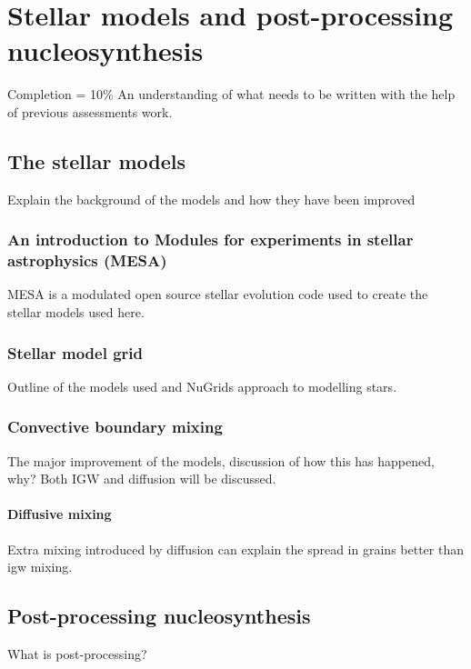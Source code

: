 \chapter{Stellar models and post-processing nucleosynthesis}

Completion = 10\%
An understanding of what needs to be written with the help of previous assessments work.

\section{The stellar models}

Explain the background of the models and how they have been improved

\subsection{An introduction to Modules for experiments in stellar astrophysics (MESA)}

MESA is a modulated open source stellar evolution code used to create the stellar models used here.

\subsection{Stellar model grid}

Outline of the models used and NuGrids approach to modelling stars.

\subsection{Convective boundary mixing}

The major improvement of the models, discussion of how this has happened, why? Both IGW and diffusion will be discussed.

\subsubsection{Diffusive mixing}

Extra mixing introduced by diffusion can explain the spread in grains better than \acrfull{igw} mixing.

\section{Post-processing nucleosynthesis}

What is post-processing?

